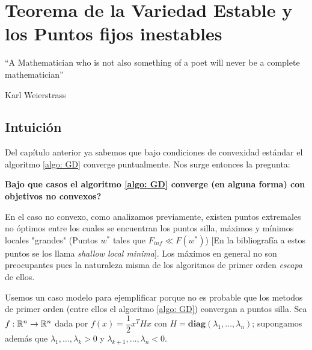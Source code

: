 \chapter{Teorema de la Variedad Estable y los Puntos fijos inestables}\label{ch:teorema-de-variedad-estable}

\epigraph{“A Mathematician who is not also something of a poet will never be a complete mathematician”}{Karl Weierstrass}

\section{Intuici\'on}

Del cap\'itulo anterior ya sabemos que bajo condiciones de convexidad est\'andar el algoritmo \ref{algo: GD} converge puntualmente. Nos surge entonces la pregunta:

\medskip 

\textbf{Bajo que casos el algoritmo \ref{algo: GD} converge (en alguna forma) con objetivos no convexos?}

\medskip


En el caso no convexo, como analizamos previamente, existen puntos extremales no \'optimos entre los cuales se encuentran los puntos silla, m\'aximos y m\'inimos locales "grandes" (\Eg Puntos $w^*$ tales que $F_{inf} \ll F(w^*)$) [En la bibliograf\'ia a estos puntos se los llama \textit{shallow local minima}]. Los m\'aximos en general no son preocupantes pues la naturaleza misma de los algoritmos de primer orden \textit{escapa} de ellos.

\bigskip
Usemos un caso modelo para ejemplificar porque no es probable que los metodos de primer orden (entre ellos el algoritmo \ref{algo: GD}) convergan a puntos silla. Sea $f: {\mathbb{R}}^n \rightarrow {\mathbb{R}}^n$ dada por $f(x) = \dfrac{1}{2} x^THx$ con $H = \textbf{diag}\left(\lambda_1, \dots, \lambda_n\right)$; supongamos adem\'as que $\lambda_1, \dots, \lambda_k > 0$ y $\lambda_{k+1}, \dots, \lambda_n <0$.


